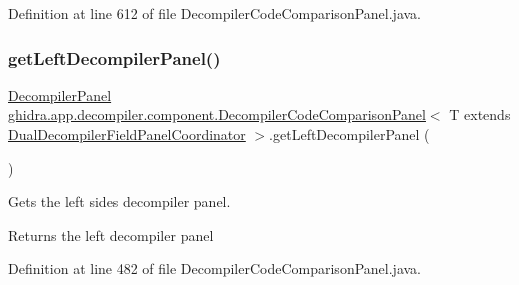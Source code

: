 Definition at line 612 of file Decompiler\+Code\+Comparison\+Panel.\+java.

\mbox{\label{classghidra_1_1app_1_1decompiler_1_1component_1_1_decompiler_code_comparison_panel_ade7f44621303975a5e9ad8b74dee4a2e}} 
\subsubsection{\texorpdfstring{getLeftDecompilerPanel()}{getLeftDecompilerPanel()}}
{\footnotesize\ttfamily \mbox{\hyperlink{classghidra_1_1app_1_1decompiler_1_1component_1_1_decompiler_panel}{Decompiler\+Panel}} \mbox{\hyperlink{classghidra_1_1app_1_1decompiler_1_1component_1_1_decompiler_code_comparison_panel}{ghidra.\+app.\+decompiler.\+component.\+Decompiler\+Code\+Comparison\+Panel}}$<$ T extends \mbox{\hyperlink{classghidra_1_1app_1_1decompiler_1_1component_1_1_dual_decompiler_field_panel_coordinator}{Dual\+Decompiler\+Field\+Panel\+Coordinator}} $>$.get\+Left\+Decompiler\+Panel (\begin{DoxyParamCaption}{ }\end{DoxyParamCaption})\hspace{0.3cm}{\ttfamily [inline]}}

Gets the left side\textquotesingle{}s decompiler panel. \begin{DoxyReturn}{Returns}
the left decompiler panel 
\end{DoxyReturn}


Definition at line 482 of file Decompiler\+Code\+Comparison\+Panel.\+java.

